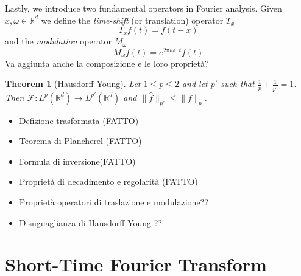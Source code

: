 \documentclass[corpo=11pt, stile=classica, tipotesi=custom,
greek, evenboxes, english]{toptesi}
\numberwithin{equation}{chapter}
\newtheorem{teo}{Theorem}[chapter] %
\newcommand{\R}{\mathbb{R}} %
\newcommand{\F}{\mathcal{F}} %
\begin{document}
Lastly, we introduce two fundamental operators in Fourier analysis. Given $x,\omega \in \R^d$ we define the \emph{time-shift} (or translation) operator $T_x$
\begin{equation}\label{time-shift operator def}
	T_x f(t) = f(t-x)
\end{equation}
and the \emph{modulation} operator $M_{\omega}$
\begin{equation}\label{modulation operator def}
	M_{\omega} f(t) = e^{2 \pi i \omega \cdot t} f(t)
\end{equation}
{\color{blue} Va aggiunta anche la composizione e le loro proprietà?}

{\color{blue}\begin{teo}[Hausdorff-Young]
	Let $1 \leq p \leq 2$ and let $p'$ such that $\frac{1}{p} + \frac{1}{p'} = 1$. Then $\F : L^p(\R^d) \rightarrow L^{p'}(\R^d)$ and $\| \hat{f }\|_{p'} \leq \| f \|_p$.
\end{teo}}

	\begin{itemize}
		\item Defizione trasformata (FATTO)
		\item Teorema di Plancherel (FATTO)
		\item Formula di inversione(FATTO)
		\item Proprietà di decadimento e regolarità (FATTO)
		\item Proprietà operatori di traslazione e modulazione??
		\item Disuguaglianza di Hausdorff-Young ??
	\end{itemize}


\chapter{Short-Time Fourier Transform}\label{chapter STFT}
\end{document}
